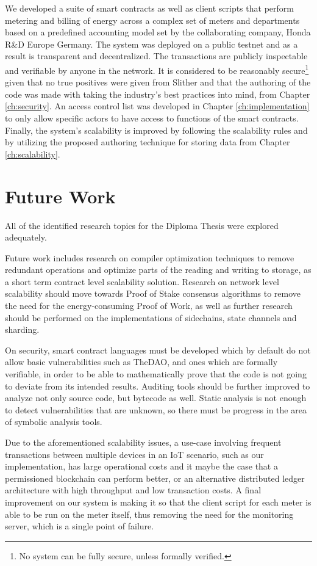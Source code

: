We developed a suite of smart contracts as well as client scripts that perform metering and billing of energy across a complex set of meters and departments based on a predefined accounting model set by the collaborating company, Honda R\&D Europe Germany. The system was deployed on a public testnet and as a result is transparent and decentralized. The transactions are publicly inspectable and verifiable by anyone in the network. It is considered to be reasonably secure\footnote{No system can be fully secure, unless formally verified.} given that no true positives were given from Slither and that the authoring of the code was made with taking the industry's best practices into mind, from Chapter \ref{ch:security}. An access control list was developed in Chapter \ref{ch:implementation} to only allow specific actors to have access to functions of the smart contracts. Finally, the system's scalability is improved by following the scalability rules and by utilizing the proposed authoring technique for storing data from Chapter \ref{ch:scalability}.


\section{Future Work}

All of the identified research topics for the Diploma Thesis were explored adequately. 

Future work includes research on compiler optimization techniques to remove redundant operations and optimize parts of the reading and writing to storage, as a short term contract level scalability solution. Research on network level scalability should move towards Proof of Stake consensus algorithms to remove the need for the energy-consuming Proof of Work, as well as further research should be performed on the implementations of sidechains, state channels and sharding.

On security, smart contract languages must be developed which by default do not allow basic vulnerabilities such as TheDAO, and ones which are formally verifiable, in order to be able to mathematically prove that the code is not going to deviate from its intended results. Auditing tools should be further improved to analyze not only source code, but bytecode as well. Static analysis is not enough to detect vulnerabilities that are unknown, so there must be progress in the area of symbolic analysis tools.

Due to the aforementioned scalability issues, a use-case involving frequent transactions between multiple devices in an IoT scenario, such as our implementation, has large operational costs and it maybe the case that a permissioned blockchain can perform better, or an alternative distributed ledger architecture with high throughput and low transaction costs. A final improvement on our system is making it so that the client script for each meter is able to be run on the meter itself, thus removing the need for the monitoring server, which is a single point of failure.